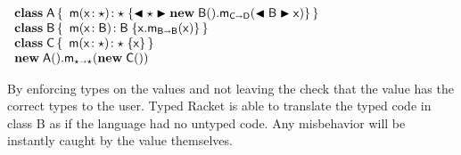 \documentclass[acmlarge, anonymous, authordraft, review]{acmart} %
\begin{document}
\vspace{2mm}
\(
  \begin{array}{l}
  \Class{\xt A}{}{\Mdef\m\x\any\any{\BehCast\any{\KCall{\New{\xt B}{}}\m{\BehCast{\xt B}\x}{\C}\D }}} \\
  \Class{\xt B}{}{\Mdef\m\x{\xt B}{\xt B}{\KCall\x\m\x{\xt B}{\xt B}}} \\
  \Class{\C}{}{\Mdef\m\x{\any}{\any}{\x}} \\
  \KCall{\New{\xt A}{}}\m{\New{\xt C}{}}\any\any
  \end{array}
\)
\vspace{2mm}


\noindent By enforcing types on the values and not leaving
the check that the value has the correct types to the user. Typed Racket is able to 
translate the typed code in class {\xt B} as if the language had no untyped 
code. Any misbehavior will be instantly caught by the value themselves.
\end{document}
